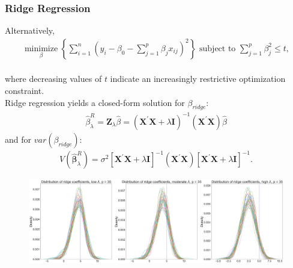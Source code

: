 \begin{frame}[fragile]
    \frametitle{Ridge Regression}
    Alternatively,
    \begin{align}
    \label{eqn:eqn2}
    \underset{\beta}{\operatorname{minimize}}\left\{\sum_{i=1}^{n}\left(y_{i}-\beta_{0}-\sum_{j=1}^{p} \beta_{j} x_{i j}\right)^{2}\right\} \text { subject to } \sum_{j=1}^{p}\beta_{j}^{2} \leq t,
    \end{align} \\
    where decreasing values of $t$ indicate an increasingly restrictive optimization constraint. \\
    Ridge regression yields a closed-form solution for $\beta_{ridge}$:
        \begin{align}
        \label{eqn:eqn3}
        \hat{\beta}_{\lambda}^{R}=\mathbf{Z}_{\lambda} \hat{\beta}=\left(\mathbf{X}^{\prime} \mathbf{X} + \lambda \mathbf{I}\right)^{-1}\left(\mathbf{X}^{\prime} \mathbf{X}\right) \hat{\beta}
        \end{align}
    and for $var(\beta_{ridge})$:
        \begin{align}
        \label{eqn:eqn4}
        V\left(\hat{\boldsymbol{\beta}}_{\lambda}^{R}\right)=\sigma^{2}\left[\mathbf{X}^{\prime} \mathbf{X} + \lambda \mathbf{I}\right]^{-1}\left(\mathbf{X}^{\prime} \mathbf{X}\right)\left[\mathbf{X}^{\prime} \mathbf{X} + \lambda \mathbf{I}\right]^{-1}.
        \end{align}
\end{frame}
\begin{frame}[fragile]
    \begin{figure}[b]
        \includegraphics[scale=0.14]{Img/ridge_shrunken_beta_dist_35.png}
        \centering
    \end{figure}
\end{frame}
